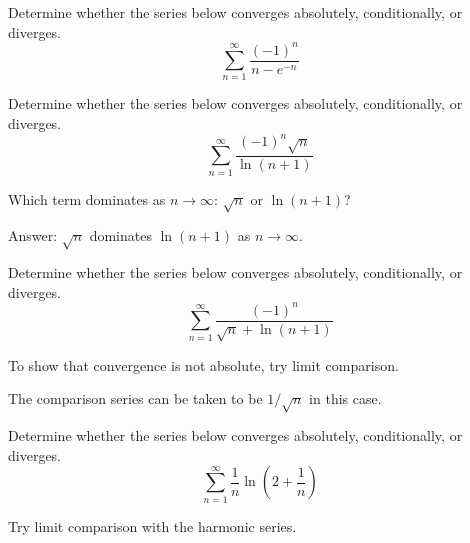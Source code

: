 \documentclass{ximera}
\begin{document}
\begin{exercise}
Determine whether the series below converges absolutely, conditionally, or diverges.
\[ \sum_{n=1}^\infty \frac{(-1)^n}{n - e^{-n}} \]
\begin{multipleChoice}
\end{multipleChoice}
\end{exercise}

\begin{exercise}
Determine whether the series below converges absolutely, conditionally, or diverges.
\[ \sum_{n=1}^\infty \frac{(-1)^n \sqrt{n}}{\ln (n+1)} \]
\begin{multipleChoice}
\end{multipleChoice}
\begin{hint}
Which term dominates as $n \rightarrow \infty$: $\sqrt{n}$ or $\ln (n+1)$?
\end{hint}
\begin{hint}
Answer: $\sqrt{n}$ dominates $\ln (n+1)$ as $n \rightarrow \infty$.
\end{hint}
\end{exercise}

\begin{exercise}
Determine whether the series below converges absolutely, conditionally, or diverges.
\[ \sum_{n=1}^\infty \frac{(-1)^n}{\sqrt{n} + \ln (n+1)} \]
\begin{multipleChoice}
\end{multipleChoice}
\begin{hint}
To show that convergence is not absolute, try limit comparison.
\end{hint}
\begin{hint}
The comparison series can be taken to be $1/\sqrt{n}$ in this case.
\end{hint}
\end{exercise}

\begin{exercise}
Determine whether the series below converges absolutely, conditionally, or diverges.
\[ \sum_{n=1}^\infty \frac{1}{n} \ln \left(2 + \frac{1}{n} \right) \]
\begin{multipleChoice}
\end{multipleChoice}
\begin{hint}
Try limit comparison with the harmonic series.
\end{hint}
\end{exercise}
\end{document}

